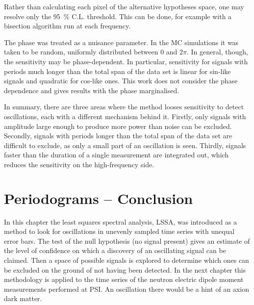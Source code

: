 Rather than calculating each pixel of the alternative hypotheses space, one may resolve only the \SI{95}{\percent} C.L. threshold. This can be done, for example with a bisection algorithm run at each frequency.

The phase was treated as a nuisance parameter. In the MC simulations it was taken to be random, uniformly distributed between $0$ and $2\pi$. In general, though, the sensitivity may be phase-dependent. In particular, sensitivity for signals with periods much longer than the total span of the data set is linear for sin-like signals and quadratic for cos-like ones. This work does not consider the phase dependence and gives results with the phase marginalised.

In summary, there are three areas where the method looses sensitivity to detect oscillations, each with a different mechanism behind it. Firstly, only signals with amplitude large enough to produce more power than noise can be excluded. Secondly, signals with periods longer than the total span of the data set are difficult to exclude, as only a small part of an oscillation is seen. Thirdly, signals faster than the duration of a single measurement are integrated out, which reduces the sensitivity on the high-frequency side.




\section*{Periodograms -- Conclusion}
In this chapter the least squares spectral analysis, LSSA, was introduced as a method to look for oscillations in unevenly sampled time series with unequal error bars. The test of the null hypothesis (no signal present) gives an estimate of the level of confidence on which a discovery of an oscillating signal can be claimed. Then a space of possible signals is explored to determine which ones can be excluded on the ground of not having been detected. In the next chapter this methodology is applied to the time series of the neutron electric dipole moment measurements performed at PSI\@. An oscillation there would be a hint of an axion dark matter.
